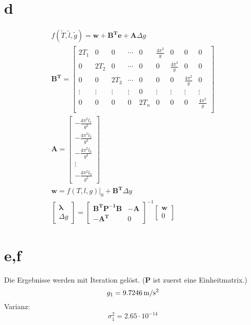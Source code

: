 \section{d}
\begin{gather*}
	f(\tilde{T},\tilde{l},\tilde{g}) = \bm{w} + \bm{B^T}\bm{e} + \bm{A}\Delta g \\
	\bm{B^T} = \begin{bmatrix}
		2T_1 & 0 & 0 & \cdots & 0 & \frac{4 \pi^2}{g} & 0 & 0 & 0 \\
		0 & 2T_2 & 0 & \cdots & 0 & 0 & \frac{4 \pi^2}{g} & 0 & 0 \\
		0 & 0 & 2T_3 & \cdots & 0 & 0 & 0 & \frac{4 \pi^2}{g} & 0 \\
		\vdots & \vdots &\vdots &\vdots & 0 & \vdots & \vdots & \vdots & \vdots \\
		0 & 0 & 0 & 0 & 2T_n & 0 & 0 & 0 & \frac{4 \pi^2}{g} \\
	\end{bmatrix}\\
	\bm{A} = \begin{bmatrix}
		 - \frac{4 \pi^2 l_1}{g^2} \\
		 - \frac{4 \pi^2 l_2}{g^2} \\
		 - \frac{4 \pi^2 l_3}{g^2} \\
		 \vdots \\
		 - \frac{4 \pi^2 l_n}{g^2}
	\end{bmatrix}\\
	\bm{w} =  f(T,l,g)|_0 + \bm{B^T}\Delta y \\
	\begin{bmatrix}
		\bm{\lambda} \\
		\Delta g
	\end{bmatrix} = \begin{bmatrix}
	\bm{B^T P^{-1} B} & -\bm{A} \\
	-\bm{A^T} & 0
\end{bmatrix}^{-1}  \begin{bmatrix}
	\bm{w} \\
	0
\end{bmatrix}
\end{gather*}
\section{e,f}
Die Ergebnisse werden mit Iteration gelöst. ($\bm{P}$ ist zuerst eine Einheitmatrix.)
\begin{equation*}
	g_1 = 9.7246 \,\mathrm{m/s^2}
\end{equation*}
Varianz:
\begin{equation*}
	\sigma^2_1 = 2.65 \cdot 10^{-14}
\end{equation*}
